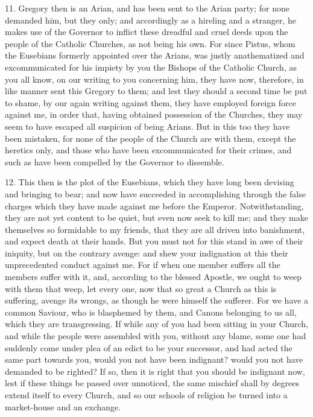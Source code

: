 11. Gregory then is an Arian, and has been sent
to the Arian party; for none demanded him, but they only; and
accordingly as a hireling and a stranger, he makes use of the Governor
to inflict these dreadful and cruel deeds upon the people of the
Catholic Churches, as not being his own. For since Pistus, whom the
Eusebians formerly appointed over the Arians, was justly anathematized
and excommunicated for his impiety by you the Bishops of the Catholic
Church, as you all know, on our writing to you concerning him, they
have now, therefore, in like manner sent this Gregory to them; and
lest they should a second time be put to shame, by our again writing
against them, they have employed foreign force against me, in order
that, having obtained possession of the Churches, they may seem to
have escaped all suspicion of being Arians. But in this too they have
been mistaken, for none of the people of the Church are with
them, except the heretics only, and those who have been excommunicated
for their crimes, and such as have been compelled by the Governor to
dissemble.

12. This then is the plot of the Eusebians, which
they have long been devising and bringing to bear; and now have
succeeded in accomplishing through the false charges which they have
made against me before the Emperor. Notwithstanding, they are not yet
content to be quiet, but even now seek to kill me; and they make
themselves so formidable to my friends, that they are all driven into
banishment, and expect death at their hands. But you must not for this
stand in awe of their iniquity, but on the contrary avenge: and shew
your indignation at this their unprecedented conduct against me. For
if when one member suffers all the members suffer with it, and,
according to the blessed Apostle, we ought to weep with them that
weep, let every one, now that so great a Church as this is suffering,
avenge its wrongs, as though he were himself the sufferer. For we have
a common Saviour, who is blasphemed by them, and Canons belonging to
us all, which they are transgressing. If while any of you had been
sitting in your Church, and while the people were assembled with you,
without any blame, some one had suddenly come under plea of an edict
to be your successor, and had acted the same part towards you, would
you not have been indignant? would you not have demanded to be
righted? If so, then it is right that you should be indignant now,
lest if these things be passed over unnoticed, the same mischief shall
by degrees extend itself to every Church, and so our schools of
religion be turned into a market-house and an exchange.

